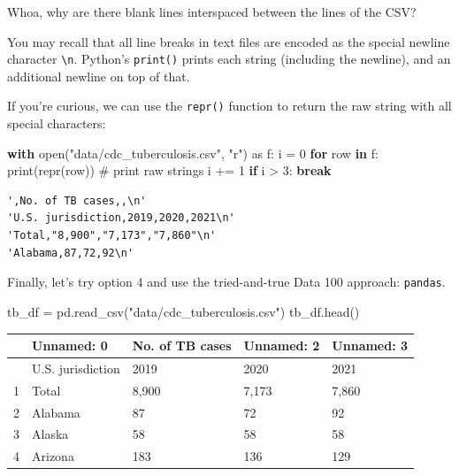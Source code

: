 \documentclass[
  letterpaper,
  DIV=11,
  numbers=noendperiod]{scrreprt}
\newenvironment{Shaded}{\begin{snugshade}}{\end{snugshade}}
\newcommand{\BuiltInTok}[1]{\textcolor[rgb]{0.00,0.23,0.31}{#1}}
\newcommand{\CommentTok}[1]{\textcolor[rgb]{0.37,0.37,0.37}{#1}}
\newcommand{\ControlFlowTok}[1]{\textcolor[rgb]{0.00,0.23,0.31}{\textbf{#1}}}
\newcommand{\DecValTok}[1]{\textcolor[rgb]{0.68,0.00,0.00}{#1}}
\newcommand{\ImportTok}[1]{\textcolor[rgb]{0.00,0.46,0.62}{#1}}
\newcommand{\KeywordTok}[1]{\textcolor[rgb]{0.00,0.23,0.31}{\textbf{#1}}}
\newcommand{\NormalTok}[1]{\textcolor[rgb]{0.00,0.23,0.31}{#1}}
\newcommand{\OperatorTok}[1]{\textcolor[rgb]{0.37,0.37,0.37}{#1}}
\newcommand{\StringTok}[1]{\textcolor[rgb]{0.13,0.47,0.30}{#1}}
\begin{document}
Whoa, why are there blank lines interspaced between the lines of the
CSV?

You may recall that all line breaks in text files are encoded as the
special newline character \texttt{\textbackslash{}n}. Python's
\texttt{print()} prints each string (including the newline), and an
additional newline on top of that.

If you're curious, we can use the \texttt{repr()} function to return the
raw string with all special characters:

\begin{Shaded}
\begin{Highlighting}[]
\ControlFlowTok{with} \BuiltInTok{open}\NormalTok{(}\StringTok{"data/cdc\_tuberculosis.csv"}\NormalTok{, }\StringTok{"r"}\NormalTok{) }\ImportTok{as}\NormalTok{ f:}
\NormalTok{    i }\OperatorTok{=} \DecValTok{0}
    \ControlFlowTok{for}\NormalTok{ row }\KeywordTok{in}\NormalTok{ f:}
        \BuiltInTok{print}\NormalTok{(}\BuiltInTok{repr}\NormalTok{(row)) }\CommentTok{\# print raw strings}
\NormalTok{        i }\OperatorTok{+=} \DecValTok{1}
        \ControlFlowTok{if}\NormalTok{ i }\OperatorTok{\textgreater{}} \DecValTok{3}\NormalTok{:}
            \ControlFlowTok{break}
\end{Highlighting}
\end{Shaded}

\begin{verbatim}
',No. of TB cases,,\n'
'U.S. jurisdiction,2019,2020,2021\n'
'Total,"8,900","7,173","7,860"\n'
'Alabama,87,72,92\n'
\end{verbatim}

Finally, let's try option 4 and use the tried-and-true Data 100
approach: \texttt{pandas}.

\begin{Shaded}
\begin{Highlighting}[]
\NormalTok{tb\_df }\OperatorTok{=}\NormalTok{ pd.read\_csv(}\StringTok{"data/cdc\_tuberculosis.csv"}\NormalTok{)}
\NormalTok{tb\_df.head()}
\end{Highlighting}
\end{Shaded}

\begin{longtable}[]{@{}lllll@{}}
\toprule\noalign{}
& Unnamed: 0 & No. of TB cases & Unnamed: 2 & Unnamed: 3 \\
\midrule\noalign{}
\endhead
\bottomrule\noalign{}
\endlastfoot
0 & U.S. jurisdiction & 2019 & 2020 & 2021 \\
1 & Total & 8,900 & 7,173 & 7,860 \\
2 & Alabama & 87 & 72 & 92 \\
3 & Alaska & 58 & 58 & 58 \\
4 & Arizona & 183 & 136 & 129 \\
\end{longtable}
\end{document}
